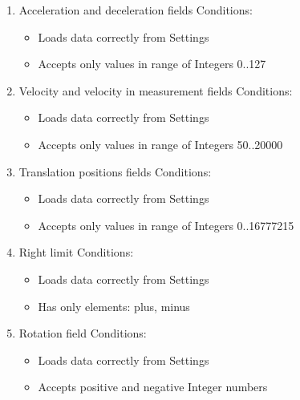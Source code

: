 \begin{enumerate}
\item Acceleration and deceleration fields
Conditions:
\begin{itemize}
\item Loads data correctly from Settings
\item Accepts only values in range of Integers 0..127
\end{itemize}

\item Velocity and velocity in measurement fields
Conditions:
\begin{itemize}
\item Loads data correctly from Settings
\item Accepts only values in range of Integers 50..20000
\end{itemize}

\item Translation positions fields
Conditions:
\begin{itemize}
\item Loads data correctly from Settings
\item Accepts only values in range of Integers 0..16777215
\end{itemize}

\item Right limit
Conditions:
\begin{itemize}
\item Loads data correctly from Settings
\item Has only elements: plus, minus
\end{itemize}

\item Rotation field
Conditions:
\begin{itemize}
\item Loads data correctly from Settings
\item Accepts positive and negative Integer numbers
\end{itemize}

\end{enumerate}